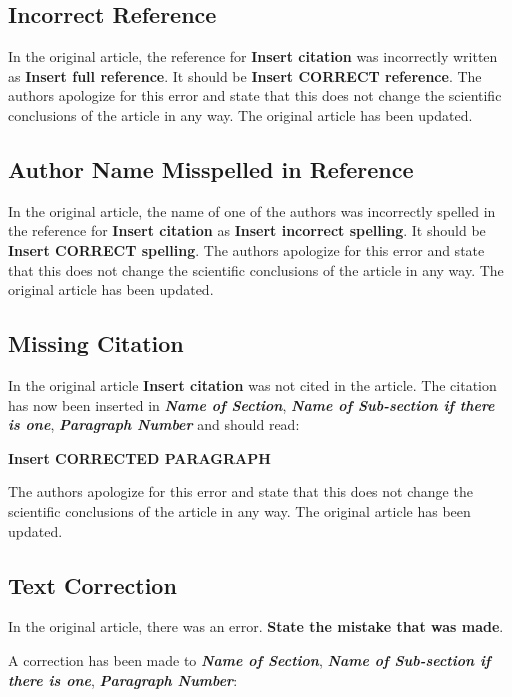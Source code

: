\documentclass[utf8]{frontiers_correction}
\begin{document}
\subsection*{Incorrect Reference}
In the original article, the reference for \textbf{Insert citation} was incorrectly written as \textbf{Insert full reference}. It should be \textbf{Insert CORRECT reference}. The authors apologize for this error and state that this does not change the scientific conclusions of the article in any way. The original article has been updated.

\subsection*{Author Name Misspelled in Reference}
In the original article, the name of one of the authors was incorrectly spelled in the reference for \textbf{Insert citation} as \textbf{Insert incorrect spelling}. It should be \textbf{Insert CORRECT spelling}. The authors apologize for this error and state that this does not change the scientific conclusions of the article in any way. The original article has been updated.

\subsection*{Missing Citation}
In the original article \textbf{Insert citation} was not cited in the article. The citation has now been inserted in \textbf{\textit{Name of Section}}, \textbf{\textit{Name of Sub-section if there is one}}, \textbf{\textit{Paragraph Number}} and should read:\par

\textbf{Insert CORRECTED PARAGRAPH}\par %

The authors apologize for this error and state that this does not change the scientific conclusions of the article in any way. The original article has been updated.

\subsection*{Text Correction}
In the original article, there was an error. \textbf{State the mistake that was made}.\par
A correction has been made to \textbf{\textit{Name of Section}}, \textbf{\textit{Name of Sub-section if there is one}}, \textbf{\textit{Paragraph Number}}:\par
\end{document}
